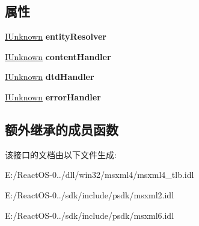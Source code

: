 \subsection*{属性}
\begin{DoxyCompactItemize}
\item 
\mbox{\label{interface_m_s_x_m_l2_1_1_i_m_x_x_m_l_filter_a8f6af0f9bc61fbca45d842686e65771e}} 
\hyperlink{interface_i_unknown}{I\+Unknown} {\bfseries entity\+Resolver}
\item 
\mbox{\label{interface_m_s_x_m_l2_1_1_i_m_x_x_m_l_filter_ab4c6e57403c1d0c0b9f950c1731f5279}} 
\hyperlink{interface_i_unknown}{I\+Unknown} {\bfseries content\+Handler}
\item 
\mbox{\label{interface_m_s_x_m_l2_1_1_i_m_x_x_m_l_filter_a7e05d572621b9ef936a49bbe4ee1f2a4}} 
\hyperlink{interface_i_unknown}{I\+Unknown} {\bfseries dtd\+Handler}
\item 
\mbox{\label{interface_m_s_x_m_l2_1_1_i_m_x_x_m_l_filter_a437e5449495c501255fb5c29caa76eaa}} 
\hyperlink{interface_i_unknown}{I\+Unknown} {\bfseries error\+Handler}
\end{DoxyCompactItemize}
\subsection*{额外继承的成员函数}


该接口的文档由以下文件生成\+:\begin{DoxyCompactItemize}
\item 
E\+:/\+React\+O\+S-\/0../dll/win32/msxml4/msxml4\+\_\+tlb.\+idl\item 
E\+:/\+React\+O\+S-\/0../sdk/include/psdk/msxml2.\+idl\item 
E\+:/\+React\+O\+S-\/0../sdk/include/psdk/msxml6.\+idl\end{DoxyCompactItemize}
